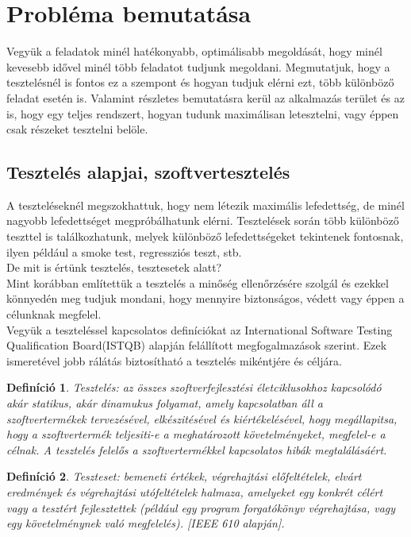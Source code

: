 \documentclass[12pt]{article}
\newtheorem{defin}{Definíció}[section]
\begin{document}
\section{Probléma bemutatása}

Vegyük a feladatok minél hatékonyabb, optimálisabb megoldását, hogy minél kevesebb idővel minél több feladatot tudjunk megoldani. Megmutatjuk, hogy a tesztelésnél is fontos ez a szempont és hogyan tudjuk elérni ezt, több különböző feladat esetén is.
Valamint részletes bemutatásra kerül az alkalmazás terület és az is, hogy egy teljes rendszert, hogyan tudunk maximálisan letesztelni, vagy éppen csak részeket tesztelni belöle.

\subsection{Tesztelés alapjai, szoftvertesztelés}

A teszteléseknél megszokhattuk, hogy nem létezik maximális lefedettség, de minél nagyobb lefedettséget megpróbálhatunk elérni. Tesztelések során több különböző teszttel is találkozhatunk, melyek különböző lefedettségeket tekintenek fontosnak, ilyen például a smoke test, regressziós teszt, stb.\\

De mit is értünk tesztelés, tesztesetek alatt?\\
Mint korábban említettük a tesztelés a minőség ellenőrzésére szolgál és ezekkel könnyedén meg tudjuk mondani, hogy mennyire biztonságos, védett vagy éppen a célunknak megfelel.\\

Vegyük a teszteléssel kapcsolatos definíciókat az International Software Testing Qualification Board(ISTQB) alapján felállított megfogalmazások szerint. Ezek ismeretével jobb rálátás biztosítható a tesztelés mikéntjére és céljára.\\

\begin{defin}
Tesztelés: az összes szoftverfejlesztési életciklusokhoz kapcsolódó akár statikus, akár dinamukus folyamat, amely kapcsolatban áll a szoftvertermékek tervezésével, elkészitésével és kiértékelésével, hogy megállapitsa, hogy a szoftvertermék teljesiti-e a meghatározott követelményeket, megfelel-e a célnak. A tesztelés felelős a szoftvertermékkel kapcsolatos hibák megtalálásáért. ~\cite{htb:masterfield}
\end{defin}

\begin{defin}
Teszteset: bemeneti értékek, végrehajtási előfeltételek, elvárt eredmények és végrehajtási utófeltételek halmaza, amelyeket egy konkrét célért vagy a tesztért fejlesztettek (például egy program forgatókönyv végrehajtása, vagy egy követelménynek való megfelelés). [IEEE 610 alapján]. ~\cite{htb:masterfield}
\end{defin}
\end{document}
